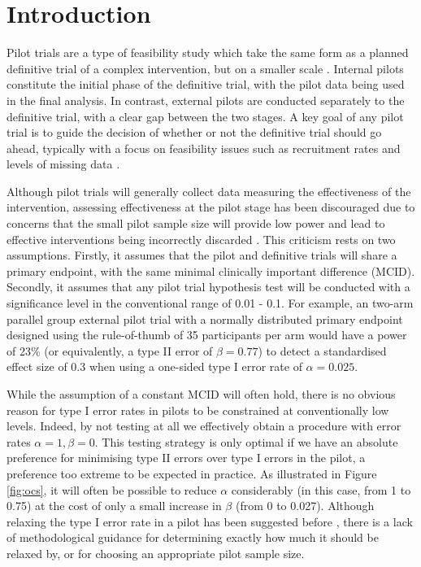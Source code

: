 \documentclass[sagev, Crown]{sagej} %
\begin{document}

\section{Introduction}

Pilot trials are a type of feasibility study which take the same form as a planned definitive trial of a complex intervention, but on a smaller scale \cite{Eldridge2016}. Internal pilots constitute the initial phase of the definitive trial,  with the pilot data being used in the final analysis. In contrast, external pilots are conducted separately to the definitive trial, with a clear gap between the two stages. A key goal of any pilot trial is to guide the decision of whether or not the definitive trial should go ahead, typically with a focus on feasibility issues such as recruitment rates and levels of missing data \cite{Craig2008, Thabane2010, Eldridge2016a}.

Although pilot trials will generally collect data measuring the effectiveness of the intervention, assessing effectiveness at the pilot stage has been discouraged due to concerns that the small pilot sample size will provide low power and lead to effective interventions being incorrectly discarded \cite{Lancaster2004, Arain2010, Westlund2016, Sim2019}. This criticism rests on two assumptions. Firstly, it assumes that the pilot and definitive trials will share a primary endpoint, with the same minimal clinically important difference (MCID). Secondly, it assumes that any pilot trial hypothesis test will be conducted with a significance level in the conventional range of 0.01 - 0.1. For example, an two-arm parallel group external pilot trial with a normally distributed primary endpoint designed using the rule-of-thumb of 35 participants per arm \cite{Teare2014} would have a power of 23\% (or equivalently, a type II error of $\beta = 0.77$) to detect a standardised effect size of 0.3 when using a one-sided type I error rate of $\alpha = 0.025$.

While the assumption of a constant MCID will often hold, there is no obvious reason for type I error rates in pilots to be constrained at conventionally low levels. Indeed,
by not testing at all we effectively obtain a procedure with error rates $\alpha = 1, \beta = 0$. This testing strategy is only optimal if we have an absolute preference for minimising type II errors over type I errors in the pilot, a preference too extreme to be expected in practice. As illustrated in Figure \ref{fig:ocs}, it will often be possible to reduce $\alpha$ considerably (in this case, from 1 to 0.75) at the cost of only a small increase in $\beta$ (from 0 to 0.027). Although relaxing the type I error rate in a pilot has been suggested before \cite{Cocks2013, Lee2014}, there is a lack of methodological guidance for determining exactly how much it should be relaxed by, or for choosing an appropriate pilot sample size. 
\end{document}
